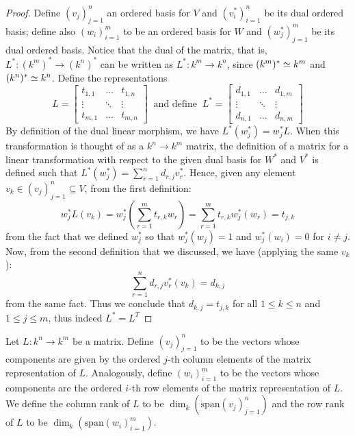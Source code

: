 \begin{proof}
  Define \((v_j)_{j=1}^n\) an ordered basis for \(V\) and \((v_i^\ast)_{i=1}^n\)
  be its dual ordered basis; define also \((w_i)_{i=1}^m\) to be an ordered
  basis for \(W\) and \((w_j^\ast)_{j=1}^m\) be its dual ordered basis. Notice
  that the dual of the matrix, that is, \(L^\ast : (k^m)^\ast \to (k^n)^\ast\)
  can be written as \(L^\ast : k^m \to k^n\), since \((k^m)^\ast \simeq k^m\) and
  \((k^n)^\ast \simeq k^n\). Define the representations
  \[
    L =
    \begin{bmatrix}
      t_{1, 1} & \dots   & t_{1, n} \\
      \vdots   & \ddots  & \vdots   \\
      t_{m, 1} & \dots   & t_{m, n}
    \end{bmatrix}
    \ \text{ and define }\
    L^\ast =
    \begin{bmatrix}
      d_{1, 1} & \dots   & d_{1, m} \\
      \vdots   & \ddots  & \vdots   \\
      d_{n, 1} & \dots   & d_{n, m}
    \end{bmatrix}
  \]
  By definition of the dual linear morphism, we have \(L^\ast(w_j^\ast) =
  w_j^\ast  L\). When this transformation is thought of as a \(k^n \to
  k^m\) matrix, the definition of a matrix for a linear transformation with
  respect to the given dual basis for \(W^\ast\) and \(V^\ast\) is defined such
  that \(L^\ast(w_j^\ast) = \sum_{r = 1}^n d_{r, j} v_r^\ast\). Hence, given any
  element \(v_k \in (v_j)_{j=1}^n \subseteq V\), from the first definition:
  \begin{equation}
    w_j^\ast  L (v_k)
    = w_j^\ast \left( \sum_{r=1}^m t_{r, k} w_r \right)
    = \sum_{r=1}^m t_{r, k} w_j^\ast(w_r)
    = t_{j, k}
  \end{equation}
  from the fact that we defined \(w_j^\ast\) so that \(w_j^\ast(w_j) = 1\) and
  \(w_j^\ast(w_i) = 0\) for \(i \neq j\). Now, from the second definition that
  we discussed, we have (applying the same \(v_k\)):
  \begin{equation}
    \sum_{r=1}^n d_{r,j} v_r^\ast(v_k)
    = d_{k, j}
  \end{equation}
  from the same fact. Thus we conclude that \(d_{k,j} = t_{j,k}\) for all \(1
  \leq k \leq n\) and \(1 \leq j \leq m\), thus indeed \(L^\ast = L^T\)
\end{proof}

\begin{definition}\label{def: column and row rank}
  Let \(L: k^n \to k^m\) be a matrix. Define \((v_j)_{j=1}^n\) to be the vectors
  whose components are given by the ordered \(j\)-th column elements of the
  matrix representation of \(L\). Analogously, define \((w_i)_{i=1}^m\) to be
  the vectors whose components are the ordered \(i\)-th row elements of the
  matrix representation of \(L\). We define the column rank of \(L\) to be
  \(\dim_k(\mathrm{span}(v_j)_{j=1}^n)\) and the row rank of \(L\) to be
  \(\dim_k(\mathrm{span}(w_i)_{i=1}^m)\).
\end{definition}


